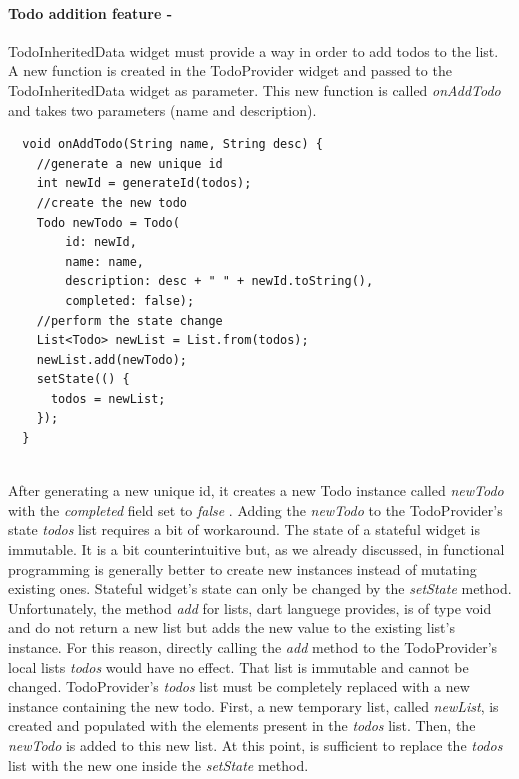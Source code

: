 \paragraph{Todo addition feature - } 
\label{subpar: todo_addition_feature_inherited_widget}
TodoInheritedData widget must provide a way in order to add todos to the list. A new function is created in the TodoProvider widget and passed to the TodoInheritedData widget as parameter. This new function is called \textit{onAddTodo} and takes two parameters (name and description).
\mbox{}\\
\mbox{}
\begin{code}
\label{code:2.32}
\begin{verbatim}
  void onAddTodo(String name, String desc) {
    //generate a new unique id
    int newId = generateId(todos);
    //create the new todo
    Todo newTodo = Todo(
        id: newId,
        name: name,
        description: desc + " " + newId.toString(),
        completed: false);
    //perform the state change
    List<Todo> newList = List.from(todos);
    newList.add(newTodo);
    setState(() {
      todos = newList;
    });
  }
\end{verbatim}
\end{code}
\mbox{}\\
After generating a new unique id, it creates a new Todo instance called \textit{newTodo }with the \textit{completed }field set to \textit{false }. Adding the \textit{newTodo} to the TodoProvider’s state \textit{todos }list requires a bit of workaround. The state of a stateful widget is immutable. It is a bit counterintuitive but, as we already discussed, in functional programming is generally better to create new instances instead of mutating existing ones. Stateful widget's state can only be changed by the \textit{setState } method. Unfortunately, the method \textit{add} for lists, dart languege provides, is of type void and do not return a new list but adds the new value to the existing list's instance. For this reason, directly calling the \textit{add} method to the TodoProvider’s local lists \textit{todos }would have no effect. That list is immutable and cannot be changed.
TodoProvider’s \textit{todos }list must be completely replaced with a new instance containing the new todo. First, a new temporary list, called \textit{newList}, is created and populated with the elements present in the \textit{todos }list. Then, the \textit{newTodo }is added to this new list. At this point, is sufficient to replace the \textit{todos }list with the new one inside the \textit{setState} method.\\

